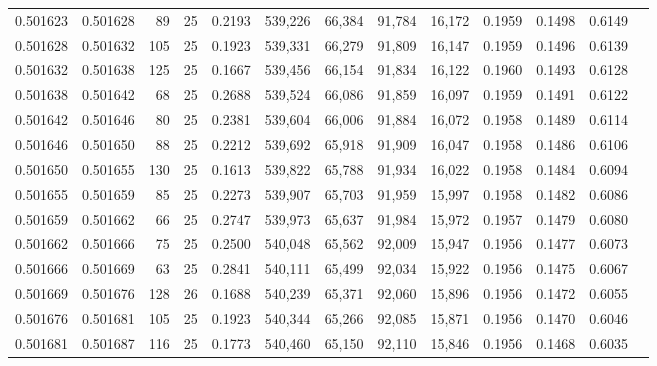 \begin{tabular}{rrrrrrrrrrrrr}
0.501623 & 0.501628 &  89 &  25 &                                     0.2193 & 539,226 &  66,384 &  91,784 &  16,172 & 0.1959 & 0.1498 & 0.6149 \\
0.501628 & 0.501632 & 105 &  25 &                                     0.1923 & 539,331 &  66,279 &  91,809 &  16,147 & 0.1959 & 0.1496 & 0.6139 \\
0.501632 & 0.501638 & 125 &  25 &                                     0.1667 & 539,456 &  66,154 &  91,834 &  16,122 & 0.1960 & 0.1493 & 0.6128 \\
0.501638 & 0.501642 &  68 &  25 &                                     0.2688 & 539,524 &  66,086 &  91,859 &  16,097 & 0.1959 & 0.1491 & 0.6122 \\
0.501642 & 0.501646 &  80 &  25 &                                     0.2381 & 539,604 &  66,006 &  91,884 &  16,072 & 0.1958 & 0.1489 & 0.6114 \\
0.501646 & 0.501650 &  88 &  25 &                                     0.2212 & 539,692 &  65,918 &  91,909 &  16,047 & 0.1958 & 0.1486 & 0.6106 \\
0.501650 & 0.501655 & 130 &  25 &                                     0.1613 & 539,822 &  65,788 &  91,934 &  16,022 & 0.1958 & 0.1484 & 0.6094 \\
0.501655 & 0.501659 &  85 &  25 &                                     0.2273 & 539,907 &  65,703 &  91,959 &  15,997 & 0.1958 & 0.1482 & 0.6086 \\
0.501659 & 0.501662 &  66 &  25 &                                     0.2747 & 539,973 &  65,637 &  91,984 &  15,972 & 0.1957 & 0.1479 & 0.6080 \\
0.501662 & 0.501666 &  75 &  25 &                                     0.2500 & 540,048 &  65,562 &  92,009 &  15,947 & 0.1956 & 0.1477 & 0.6073 \\
0.501666 & 0.501669 &  63 &  25 &                                     0.2841 & 540,111 &  65,499 &  92,034 &  15,922 & 0.1956 & 0.1475 & 0.6067 \\
0.501669 & 0.501676 & 128 &  26 &                                     0.1688 & 540,239 &  65,371 &  92,060 &  15,896 & 0.1956 & 0.1472 & 0.6055 \\
0.501676 & 0.501681 & 105 &  25 &                                     0.1923 & 540,344 &  65,266 &  92,085 &  15,871 & 0.1956 & 0.1470 & 0.6046 \\
0.501681 & 0.501687 & 116 &  25 &                                     0.1773 & 540,460 &  65,150 &  92,110 &  15,846 & 0.1956 & 0.1468 & 0.6035 \\

\end{tabular}
